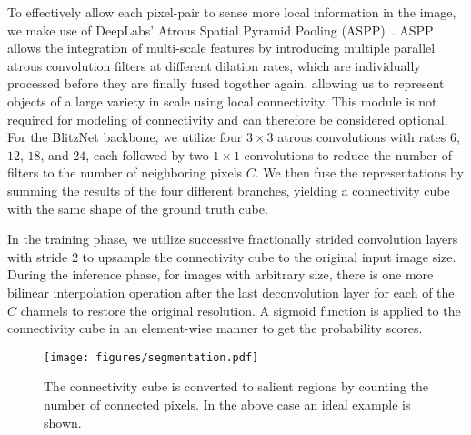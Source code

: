 \documentclass[journal]{IEEEtran}
\begin{document}
To effectively allow each pixel-pair to sense more local information in the image, we make use of DeepLabs' Atrous Spatial Pyramid Pooling (ASPP)~\cite{chen2016deeplab}. ASPP allows the integration of multi-scale features by introducing multiple parallel atrous convolution filters at different dilation rates, which are individually processed before they are finally fused together again, allowing us to represent objects of a large variety in scale using local connectivity. This module is not required for modeling of connectivity and can therefore be considered optional.
For the BlitzNet backbone, we utilize four $3\times3$ atrous convolutions with rates $6$, $12$, $18$, and $24$, each followed by two $1\times1$ convolutions to reduce the number of filters to the number of neighboring pixels $C$. We then fuse the representations by summing the results of the four different branches, yielding a connectivity cube with the same shape of the ground truth cube.  

In the training phase, we utilize successive fractionally strided convolution layers with stride 2 to upsample the connectivity cube to the original input image size. During the inference phase, for images with arbitrary size, there is one more bilinear interpolation operation after the last deconvolution layer for each of the $C$ channels to restore the original resolution. A sigmoid function is applied to the connectivity cube in an element-wise manner to get the probability scores.

\begin{figure}[t]
\centering
\texttt{[image: figures/segmentation.pdf]}
\caption{The connectivity cube is converted to salient regions by counting the number of connected pixels. In the above case an ideal example is shown.}
\label{fig:connToSal}
\end{figure}
\end{document}

